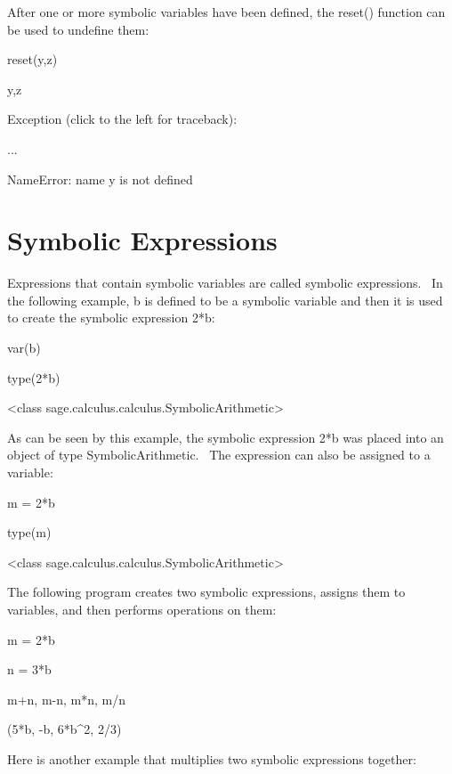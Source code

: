 \documentclass[12pt,twoside]{book}
\begin{document}
After one or more symbolic variables have been defined, the reset()
function can be used to undefine them:


\bigskip

reset({\textquotesingle}y,z{\textquotesingle})

y,z

{\textbar}

Exception (click to the left for traceback):

...

NameError: name {\textquotesingle}y{\textquotesingle} is not defined

\section[Symbolic Expressions]{Symbolic Expressions}
Expressions that contain symbolic variables are called symbolic
expressions. \ In the following example, b is defined to be a symbolic
variable and then it is used to create the symbolic expression 2*b:


\bigskip

var({\textquotesingle}b{\textquotesingle})

type(2*b)

{\textbar}

{\textless}class
{\textquotesingle}sage.calculus.calculus.SymbolicArithmetic{\textquotesingle}{\textgreater}

As can be seen by this example, the symbolic expression 2*b was placed
into an object of type SymbolicArithmetic. \ The expression can also be
assigned to a variable:


\bigskip

m = 2*b

type(m)

{\textbar}

{\textless}class
{\textquotesingle}sage.calculus.calculus.SymbolicArithmetic{\textquotesingle}{\textgreater}

The following program creates two symbolic expressions, assigns them to
variables, and then performs operations on them:


\bigskip

m = 2*b

n = 3*b

m+n, m{}-n, m*n, m/n

{\textbar}

(5*b, {}-b, 6*b\^{}2, 2/3)

Here is another example that multiplies two symbolic expressions
together:
\end{document}

